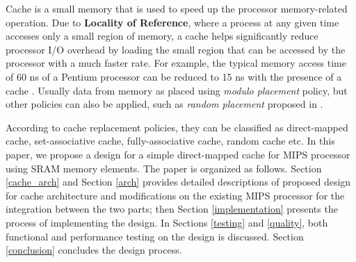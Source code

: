\documentclass[conference]{IEEEtran}
\begin{document}
Cache is a small memory that is used to speed up the processor memory-related operation. Due to \textbf{Locality of Reference}, where a process at any given time accesses only a small region of memory, a cache helps significantly reduce processor I/O overhead by loading the small region that can be accessed by the processor with a much faster rate. For example, the typical memory access time of 60 ns of a Pentium processor can be reduced to 15 ns with the presence of a cache \cite{intel}. Usually data from memory as placed using \textit{modulo placement} policy, but other policies can also be applied, such as \textit{random placement} proposed in \cite{random_place}.

According to cache replacement policies, they can be classified as direct-mapped cache, set-associative cache, fully-associative cache, random cache \cite{random_replace} etc. In this paper, we propose a design for a simple direct-mapped cache for MIPS processor using SRAM memory elements. The paper is organized as follows. Section \ref{cache_arch} and Section \ref{arch} provides detailed descriptions of proposed design for cache architecture and modifications on the existing MIPS processor for the integration between the two parts; then Section \ref{implementation} presents the process of implementing the design. In Sections \ref{testing} and \ref{quality}, both functional and performance testing on the design is discussed. Section \ref{conclusion} concludes the design process.

%


% 

%
%
\end{document}
